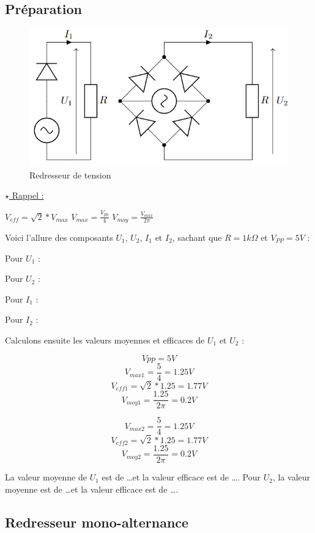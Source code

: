 \subsection{Préparation}

\begin{figure}[H]
    \begin{center}
    \includegraphics[scale=0.5]{images/4.png}
    \caption{Redresseur de tension}
    \end{center}
\end{figure}

\underline{$\star$ Rappel :}

$V_{eff}=\sqrt{2}*V_{max}$
$V_{max}=\frac{V_{pp}}{4}$
$V_{moy}=\frac{V_{max}}{2\pi}$

Voici l'allure des composants $U_1$, $U_2$, $I_1$ et $I_2$, sachant que $R=1k\Omega$ et $V_{PP}=5V$ :

Pour $U_1$ :

Pour $U_2$ :

Pour $I_1$ :

Pour $I_2$ :

Calculons ensuite les valeurs moyennes et efficaces de $U_1$ et $U_2$ :

\[V{pp}=5V\]
\[V_{max1}=\frac{5}{4}=1.25V\]
\[V_{eff1}=\sqrt{2}*1.25=1.77V\]
\[V_{moy1}=\frac{1.25}{2\pi}=0.2V\]

\[V_{max2}=\frac{5}{4}=1.25V\]
\[V_{eff2}=\sqrt{2}*1.25=1.77V\]
\[V_{moy2}=\frac{1.25}{2\pi}=0.2V\]


La valeur moyenne de $U_1$ est de \dots et la valeur efficace est de \dots. Pour $U_2$, la valeur moyenne est de \dots et la valeur efficace est de \dots.



\subsection{Redresseur mono-alternance}

